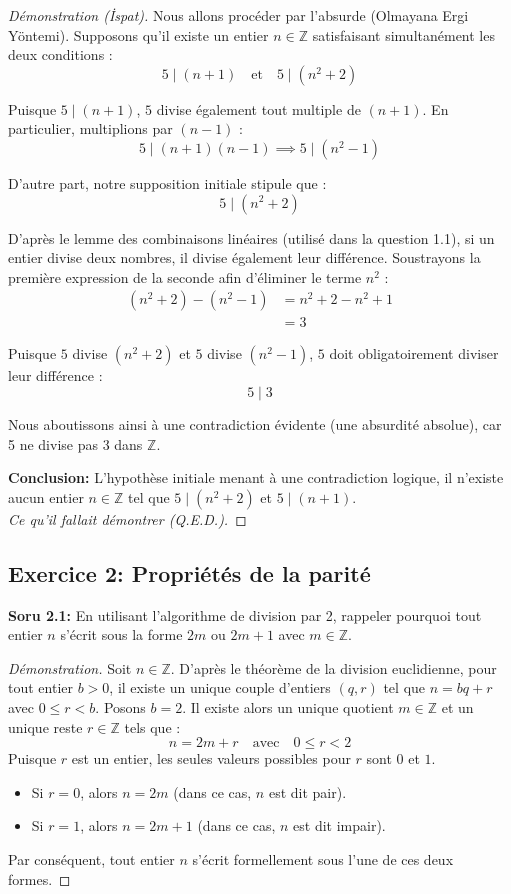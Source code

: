 \documentclass[12pt,a4paper]{report}
\begin{document}
\begin{proof}[Démonstration (İspat)]
Nous allons procéder par l'absurde (Olmayana Ergi Yöntemi). Supposons qu'il existe un entier $n \in \mathbb{Z}$ satisfaisant simultanément les deux conditions :
\begin{equation}
5 \mid (n+1) \quad \text{et} \quad 5 \mid (n^2+2)
\end{equation}

Puisque $5 \mid (n+1)$, $5$ divise également tout multiple de $(n+1)$. En particulier, multiplions par $(n-1)$ :
\[ 5 \mid (n+1)(n-1) \implies 5 \mid (n^2 - 1) \]

D'autre part, notre supposition initiale stipule que :
\[ 5 \mid (n^2 + 2) \]

D'après le lemme des combinaisons linéaires (utilisé dans la question 1.1), si un entier divise deux nombres, il divise également leur différence. Soustrayons la première expression de la seconde afin d'éliminer le terme $n^2$ :
\begin{align*}
(n^2 + 2) - (n^2 - 1) &= n^2 + 2 - n^2 + 1 \\
&= 3
\end{align*}

Puisque $5$ divise $(n^2+2)$ et $5$ divise $(n^2-1)$, $5$ doit obligatoirement diviser leur différence :
\[ 5 \mid 3 \]

Nous aboutissons ainsi à une contradiction évidente (une absurdité absolue), car 5 ne divise pas 3 dans $\mathbb{Z}$.

\textbf{Conclusion:} L'hypothèse initiale menant à une contradiction logique, il n'existe aucun entier $n \in \mathbb{Z}$ tel que $5 \mid (n^2+2)$ et $5 \mid (n+1)$. \\
\textit{Ce qu'il fallait démontrer (Q.E.D.).}
\end{proof}

\subsection*{Exercice 2: Propriétés de la parité}
\textbf{Soru 2.1:} En utilisant l'algorithme de division par 2, rappeler pourquoi tout entier $n$ s'écrit sous la forme $2m$ ou $2m + 1$ avec $m \in \mathbb{Z}$.

\begin{proof}[Démonstration]
Soit $n \in \mathbb{Z}$. D'après le théorème de la division euclidienne, pour tout entier $b > 0$, il existe un unique couple d'entiers $(q, r)$ tel que $n = bq + r$ avec $0 \leq r < b$.
Posons $b = 2$. Il existe alors un unique quotient $m \in \mathbb{Z}$ et un unique reste $r \in \mathbb{Z}$ tels que :
\[ n = 2m + r \quad \text{avec} \quad 0 \leq r < 2 \]
Puisque $r$ est un entier, les seules valeurs possibles pour $r$ sont $0$ et $1$.
\begin{itemize}
    \item Si $r = 0$, alors $n = 2m$ (dans ce cas, $n$ est dit pair).
    \item Si $r = 1$, alors $n = 2m + 1$ (dans ce cas, $n$ est dit impair).
\end{itemize}
Par conséquent, tout entier $n$ s'écrit formellement sous l'une de ces deux formes.
\end{proof}
\end{document}
